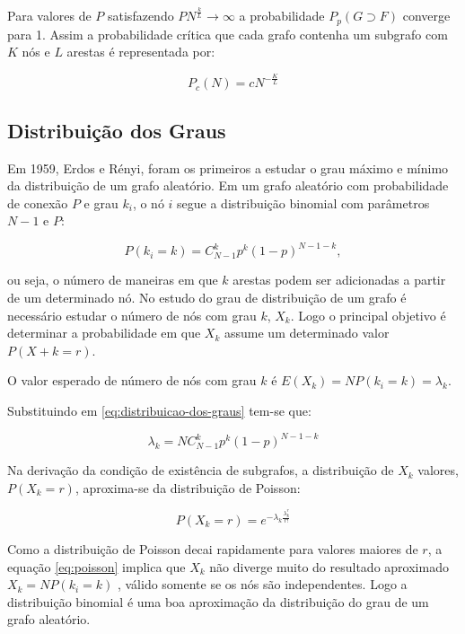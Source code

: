 \documentclass[brazil,ruledheader]{abnt}
\begin{document}
Para valores de $P$ satisfazendo $PN^{\frac{k}{L}}\rightarrow \infty$ a
probabilidade $P_p(G\supset F)$ converge para 1. Assim a probabilidade crítica
que cada grafo contenha um subgrafo com $K$ nós e $L$ arestas é representada
por: 

\begin{equation}
P_c(N)=cN^{-\frac{K}{L}}
\end{equation}



\subsection{Distribuição dos Graus}

Em 1959, Erdos e Rényi, foram os primeiros a estudar o grau máximo e mínimo da
distribuição de um grafo aleatório.  Em um grafo aleatório com probabilidade de
conexão $P$ e grau $k_i$, o nó $i$ segue a distribuição binomial com
parâmetros $N - 1$ e $P$:

\begin{equation}
P(k_i=k)=C_{N-1}^k p^k(1-p)^{N-1-k},
\label{eq:distribuicao-dos-graus}
\end{equation}

ou seja, o número de maneiras em que $k$ arestas podem ser
adicionadas a partir de um determinado nó.  No estudo do grau de distribuição de
um grafo é necessário estudar o número de nós com grau $k$, $X_k$. Logo o
principal objetivo é determinar a probabilidade em que $X_k$  assume um
determinado valor $P(X+k=r)$.

O valor esperado de número de nós com grau $k$ é $E(X_k) = NP(k_i=k) =
\lambda_k$.

Substituindo em \ref{eq:distribuicao-dos-graus} tem-se que:

\begin{equation}
\lambda_k=NC_{N-1}^k p^k(1-p)^{N-1-k}
\end{equation}


Na derivação da condição de existência de subgrafos, a distribuição de
$X_k$ valores, $P(X_k = r)$, aproxima-se da distribuição de Poisson:

\begin{equation}
\label{eq:poisson}
P(X_k=r)=e^{-\lambda_k\frac{\lambda_k^r}{r!}}
\end{equation}

Como a distribuição de Poisson decai rapidamente para valores maiores de $r$, a
equação \ref{eq:poisson} implica que $X_k$ não diverge muito do resultado
aproximado $X_k=NP(k_i=k)$ ,  válido somente se os nós são independentes. Logo a
distribuição binomial é uma boa aproximação da distribuição do grau de um grafo
aleatório.
\end{document}
